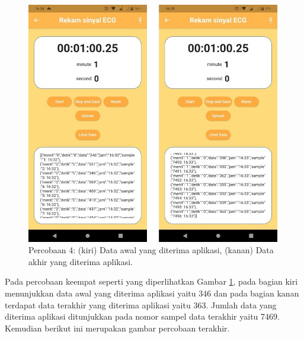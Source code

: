 \begin{figure}[H] \centering
	\includegraphics[width=1\textwidth]{img/percob/Slide14}
	\caption{Percobaan 4: (kiri) Data awal yang diterima aplikasi, (kanan) Data akhir yang diterima aplikasi.}
	\label{fig:4.2.6}
\end{figure}
\vspace{1ex}
Pada percobaan keempat seperti yang diperlihatkan Gambar \ref{fig:4.2.6}, pada bagian kiri menunjukkan data awal yang diterima aplikasi yaitu 346 dan pada bagian kanan terdapat data terakhir yang diterima aplikasi yaitu 363. Jumlah data yang diterima aplikasi ditunjukkan pada nomor sampel data terakhir yaitu 7469. Kemudian berikut ini merupakan gambar percobaan terakhir.
